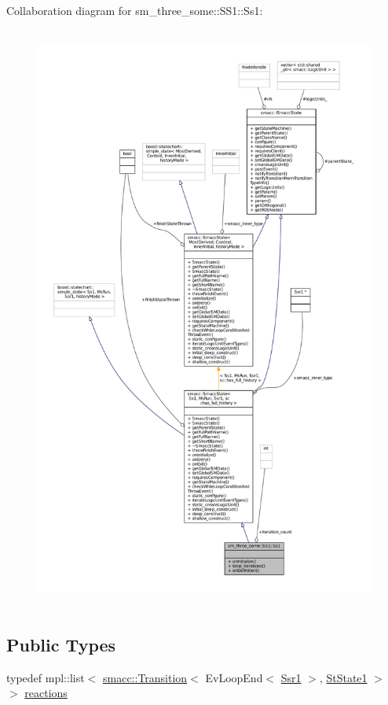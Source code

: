 Collaboration diagram for sm\+\_\+three\+\_\+some\+:\+:S\+S1\+:\+:Ss1\+:
\nopagebreak
\begin{figure}[H]
\begin{center}
\leavevmode
\includegraphics[height=550pt]{structsm__three__some_1_1SS1_1_1Ss1__coll__graph}
\end{center}
\end{figure}
\subsection*{Public Types}
\begin{DoxyCompactItemize}
\item 
typedef mpl\+::list$<$ \hyperlink{classsmacc_1_1Transition}{smacc\+::\+Transition}$<$ Ev\+Loop\+End$<$ \hyperlink{structsm__three__some_1_1ss1__states_1_1Ssr1}{Ssr1} $>$, \hyperlink{structsm__three__some_1_1StState1}{St\+State1} $>$ $>$ \hyperlink{structsm__three__some_1_1SS1_1_1Ss1_a09a0d51d0894f06bfd359ab0d09d722e}{reactions}
\end{DoxyCompactItemize}
